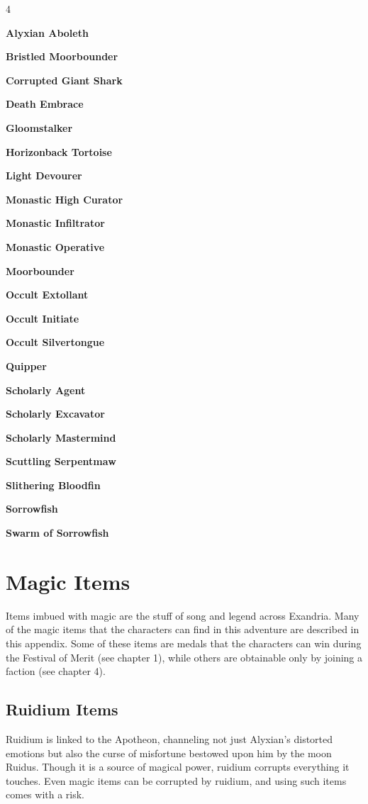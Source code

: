 \documentclass[10pt,a4paper,twoside,fancy,bg=print,twocolumn,openany,nodeprecatedcode]{dndbook}
\begin{document}
\begin{itemize}
\begin{multicols}{4}
\item \textbf{Alyxian Aboleth}
\item \textbf{Bristled Moorbounder}
\item \textbf{Corrupted Giant Shark}
\item \textbf{Death Embrace}
\item \textbf{Gloomstalker}
\item \textbf{Horizonback Tortoise}
\item \textbf{Light Devourer}
\item \textbf{Monastic High Curator}
\item \textbf{Monastic Infiltrator}
\item \textbf{Monastic Operative}
\item \textbf{Moorbounder}
\item \textbf{Occult Extollant}
\item \textbf{Occult Initiate}
\item \textbf{Occult Silvertongue}
\item \textbf{Quipper}
\item \textbf{Scholarly Agent}
\item \textbf{Scholarly Excavator}
\item \textbf{Scholarly Mastermind}
\item \textbf{Scuttling Serpentmaw}
\item \textbf{Slithering Bloodfin}
\item \textbf{Sorrowfish}
\item \textbf{Swarm of Sorrowfish}
\end{multicols}

\end{itemize}

\chapter{Magic Items}
Items imbued with magic are the stuff of song and legend across Exandria. Many of the magic items that the characters can find in this adventure are described in this appendix. Some of these items are medals that the characters can win during the Festival of Merit (see chapter 1), while others are obtainable only by joining a faction (see chapter 4).

\section{Ruidium Items}
Ruidium is linked to the Apotheon, channeling not just Alyxian's distorted emotions but also the curse of misfortune bestowed upon him by the moon Ruidus. Though it is a source of magical power, ruidium corrupts everything it touches. Even magic items can be corrupted by ruidium, and using such items comes with a risk.
\end{document}
